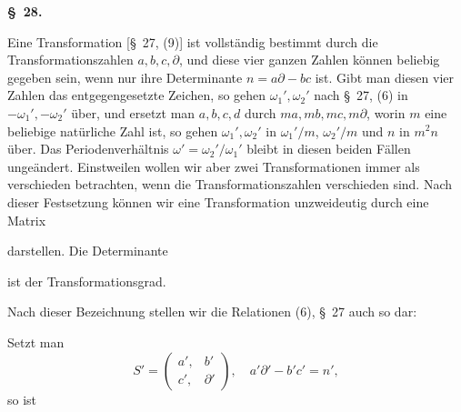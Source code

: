 
\begin{center}
\textbf{\S\ 28.\quad{}}
\end{center}

Eine Transformation [\S\ 27, (9)] ist vollständig bestimmt durch die Transformationszahlen $a, b, c, \partial$, und diese vier ganzen Zahlen können beliebig gegeben sein, wenn nur ihre Determinante $n = a\partial - bc$  ist. Gibt man diesen vier Zahlen das entgegengesetzte Zeichen, so gehen $\omega_1', \omega_2'$ nach \S\ 27, (6) in $-\omega_1', -\omega_2'$ über, und ersetzt man $a, b, c, d$ durch $ma, mb, mc, m\partial$, %
worin $m$ eine beliebige natürliche Zahl ist, so gehen $\omega_1', \omega_2'$ in $\omega_1'/m$, $\omega_2'/m$ und $n$ in $m^2n$ über. Das Periodenverhältnis $\omega' = \omega_2'/\omega_1'$ bleibt in diesen beiden Fällen ungeändert. Einstweilen wollen wir aber zwei Transformationen immer als verschieden betrachten, wenn die Transformationszahlen verschieden sind. Nach dieser Festsetzung können wir eine Transformation unzweideutig durch eine Matrix


darstellen. Die Determinante


ist der Transformationsgrad.

Nach dieser Bezeichnung stellen wir die Relationen (6), \S\ 27 auch so dar:


Setzt man
\[
S' = \begin{pmatrix} a', & b' \\ c', & \partial' \end{pmatrix}, \quad a'\partial' - b'c' = n',
\]
so ist


